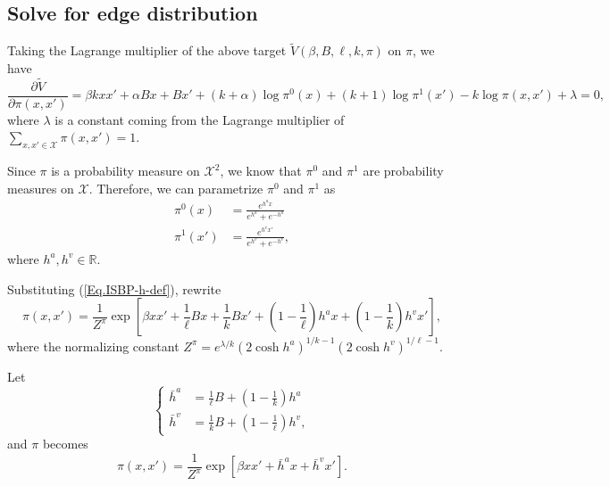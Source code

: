 \documentclass[12pt]{article}
\numberwithin{equation}{section}
\begin{document}
\subsection{Solve for edge distribution}

Taking the Lagrange multiplier of the above target $\widetilde{V}(\beta, B, \ell, k, \pi)$ on $\pi$, we have
\begin{equation*}
    \frac{\partial \widetilde{V}}{\partial \pi(x, x')} = \beta k x x' + \alpha B x + B x' + (k+\alpha) \log \pi^0(x) + (k+1)\log\pi^1(x') - k\log\pi(x, x') + \lambda = 0,
\end{equation*}
where $\lambda$ is a constant coming from the Lagrange multiplier of $\sum_{x, x'\in\mathcal{X}} \pi(x, x') = 1$.

Since $\pi$ is a probability measure on $\mathcal{X}^2$, we know that $\pi^0$ and $\pi^1$ are probability measures on $\mathcal{X}$.
Therefore, we can parametrize $\pi^0$ and $\pi^1$ as
\begin{equation}
    \begin{aligned}
        \pi^0(x)  & = \frac{e^{h^a x}}{e^{h^a} + e^{-h^a}}   \\
        \pi^1(x') & = \frac{e^{h^v x'}}{e^{h^v} + e^{-h^v}},
    \end{aligned}
    \label{Eq.ISBP-h-def}
\end{equation}
where $h^a, h^v\in\mathbb{R}$.

Substituting (\ref{Eq.ISBP-h-def}), rewrite
\begin{equation}
    \pi(x, x') = \frac1{Z^\pi} \exp\left[\beta xx' + \frac1\ell Bx + \frac1kBx' + \left(1-\frac1\ell\right)h^ax + \left(1-\frac1k\right)h^vx'\right],
\end{equation}
where the normalizing constant $Z^\pi=e^{\lambda/k}(2\cosh h^a)^{1/k-1}(2\cosh h^v)^{1/\ell-1}$.

Let
\begin{equation}
    \begin{cases}
        \bar{h}^a & = \frac1\ell B + \left(1 - \frac1k\right)h^a  \\
        \bar{h}^v & = \frac1k B + \left(1 - \frac1\ell\right)h^v,
    \end{cases}
    \label{Eq.ISBP-hbar-def}
\end{equation}
and $\pi$ becomes
\begin{equation}
    \pi(x, x') = \frac1{Z^\pi} \exp\left[\beta xx' + \bar{h}^a x + \bar{h}^v x'\right].
    \label{Eq.ISBP-pi-hbar}
\end{equation}
\end{document}
